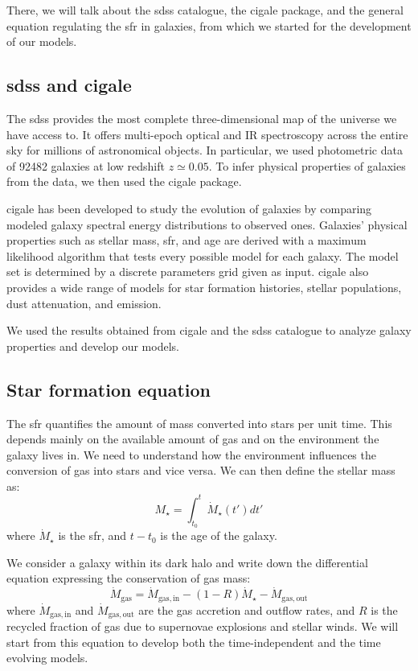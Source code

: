 \documentclass[fleqn, usenatbib]{mnras}
\begin{document}
There, we will talk about the \acrshort{sdss} catalogue, the \acrshort{cigale} package, and the general equation regulating the \acrfull{sfr} in galaxies, from which we started for the development of our models.

\subsection{\acrshort{sdss} and \acrshort{cigale}}

The \acrshort{sdss} provides the most complete three-dimensional map of the universe we have access to. It offers multi-epoch optical and IR spectroscopy across the entire sky for millions of astronomical objects. In particular, we used photometric data of 92482 galaxies at low redshift \(z \simeq 0.05\). To infer physical properties of galaxies from the data, we then used the \acrshort{cigale} package.

\acrshort{cigale} has been developed to study the evolution of galaxies by comparing modeled galaxy spectral energy distributions to observed ones. Galaxies' physical properties such as stellar mass, \acrshort{sfr}, and age are derived with a maximum likelihood algorithm that tests every possible model for each galaxy. The model set is determined by a discrete parameters grid given as input. \acrshort{cigale} also provides a wide range of models for star formation histories, stellar populations, dust attenuation, and emission.

We used the results obtained from \acrshort{cigale} and the \acrshort{sdss} catalogue to analyze galaxy properties and develop our models.

\subsection{Star formation equation}

The \acrlong{sfr} quantifies the amount of mass converted into stars per unit time. This depends mainly on the available amount of gas and on the environment the galaxy lives in. We need to understand how the environment influences the conversion of gas into stars and vice versa.
We can then define the stellar mass as:
\begin{equation} \label{eq:stellar_mass}
	M_{\star} = \int_{t_0}^t \dot{M}_\star(t')dt'
\end{equation}
where \(\dot{M}_{\star}\) is the \acrshort{sfr}, and \(t - t_0\) is the age of the galaxy.

We consider a galaxy within its dark halo and write down the differential equation expressing the conservation of gas mass:
\begin{equation} \label{eq:gas_conservation}
	\dot{M}_{\mathrm{gas}} = \dot{M}_{\mathrm{gas, in}} - (1 - R) \dot{M}_{\star} - \dot{M}_{\mathrm{gas, out}}
\end{equation}
where \(\dot{M}_{\mathrm{gas, in}}\) and \(\dot{M}_{\mathrm{gas, out}}\) are the gas accretion and outflow rates, and \(R\) is the recycled fraction of gas due to supernovae explosions and stellar winds. We will start from this equation to develop both the time-independent and the time evolving models.
\end{document}
